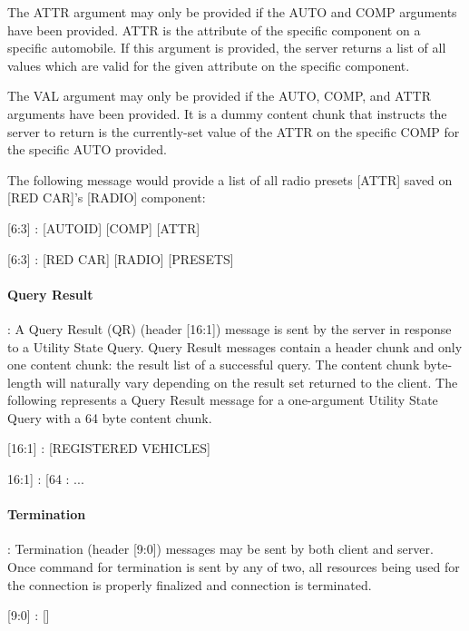The ATTR argument may only be provided if the AUTO and COMP arguments have been provided. ATTR is the attribute of the specific component on a specific automobile. If this argument is provided, the server returns a list of all values which are valid for the given attribute on the specific component.

The VAL argument may only be provided if the AUTO, COMP, and ATTR arguments have been provided. It is a dummy content chunk that instructs the server to return  is the currently-set value of the ATTR on the specific COMP for the specific AUTO provided.

The following message would provide a list of all radio presets [ATTR] saved on [RED CAR]'s [RADIO] component:

\begin{center}
{\textsf{[6:3] : [AUTOID] [COMP] [ATTR]}}

{\textsf{[6:3] : [RED CAR] [RADIO] [PRESETS]}}
\end{center}

\paragraph{Query Result}: A Query Result (QR) (header [16:1]) message is sent by the server in response to a Utility State Query. Query Result messages contain a  header chunk and only one content chunk: the result list of a successful query. The content chunk byte-length will naturally vary depending on the result set returned to the client. The following represents a Query Result message for a one-argument Utility State Query with a 64 byte content chunk.

\begin{center}
{\textsf{[16:1] : [REGISTERED VEHICLES]}}

{\textsf{16:1] : [64 : ... }}
\end{center}


\paragraph{Termination}: Termination (header [9:0]) messages may be sent by both client and server. Once command for termination is sent by any of two, all resources being used for the connection is properly finalized and connection is terminated.

\begin{center}
{\textsf{[9:0] : []}}
\end{center}



